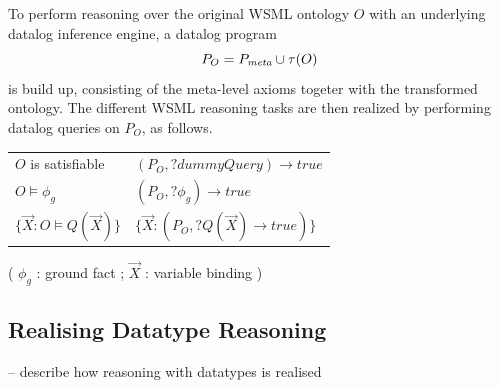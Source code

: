 To perform reasoning over the original WSML ontology $O$ with an
underlying datalog inference engine, a datalog program
\begin{displaymath}
    P_O = \mlaxioms \cup \tau(O)
\end{displaymath}
is build up, consisting of the meta-level axioms togeter with the
transformed ontology. The different WSML reasoning tasks are then
realized by performing datalog queries on $P_O$, as follows.
\begin{small}
\begin{tabular}{|l|l|}
  \hline
  $O$ is satisfiable & $(P_O, ?\textit{dummyQuery}) \rightarrow true$ \\
  $O \models \phi_g$ & $(P_O, ?\phi_g) \rightarrow true$ \\
  $\{\vec{X} : O \models Q(\vec{X})\}$ & $\{\vec{X} : (P_O, ?Q(\vec{X}) \rightarrow true)\}$ \\
 \hline
\end{tabular}
\end{small}

( $\phi_g$ : ground fact ; $\vec{X}$ : variable binding )


\subsection{Realising Datatype Reasoning}
-- describe how reasoning with datatypes is realised

